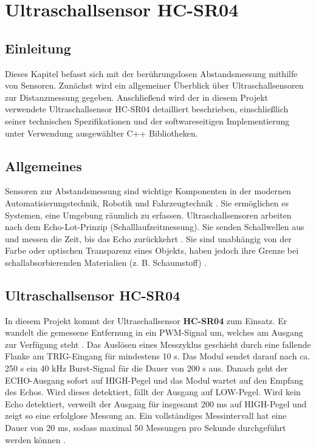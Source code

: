 %
%

\chapter{Ultraschallsensor HC-SR04}

\section*{Einleitung}
Dieses Kapitel befasst sich mit der berührungslosen Abstandsmessung mithilfe von Sensoren. Zunächst wird ein allgemeiner Überblick über Ultraschallsensoren zur Distanzmessung gegeben. Anschlie\ss end wird der in diesem Projekt verwendete Ultraschallsensor HC-SR04 detailliert beschrieben, einschlie\ss lich seiner technischen Spezifikationen und der softwareseitigen Implementierung unter Verwendung ausgewählter C++ Bibliotheken.

\section{Allgemeines}
Sensoren zur Abstandsmessung sind wichtige  Komponenten in der modernen Automatisierungstechnik, Robotik und Fahrzeugtechnik \cite{Fraden:2016}. Sie ermöglichen es Systemen, eine Umgebung räumlich zu erfassen. 
Ultraschallsensoren  arbeiten nach dem Echo-Lot-Prinzip (Schalllaufzeitmessung). Sie senden Schallwellen aus und messen die Zeit, bis das Echo zurückkehrt \cite{SparkFun:2020}. Sie sind unabhängig von der Farbe oder optischen Transparenz eines Objekts, haben jedoch ihre Grenze bei schallabsorbierenden Materialien (z. B. Schaumstoff) \cite{Fraden:2016}.

\section{Ultraschallsensor HC-SR04}
In diesem Projekt kommt der Ultraschallsensor \textbf{HC-SR04} zum Einsatz. Er wandelt die gemessene Entfernung in ein PWM-Signal um, welches am Ausgang zur Verfügung steht \cite{KT:2012}. Das Auslösen eines Messzyklus geschieht durch eine fallende Flanke am TRIG-Eingang  für mindestens 10 \textmu s. Das Modul sendet darauf nach ca. 250 \textmu s ein 40 kHz Burst-Signal für die Dauer von 200 \textmu s aus. Danach geht der ECHO-Ausgang sofort auf HIGH-Pegel und das Modul wartet auf den Empfang des Echos. Wird dieses detektiert, fällt der Ausgang auf LOW-Pegel. Wird kein Echo detektiert, verweilt der Ausgang für insgesamt 200 ms auf HIGH-Pegel und zeigt so eine erfolglose Messung an. Ein vollständiges Messintervall hat eine Dauer von 20 ms, sodass maximal 50 Messungen pro Sekunde durchgeführt werden können \cite{KT:2012}.

